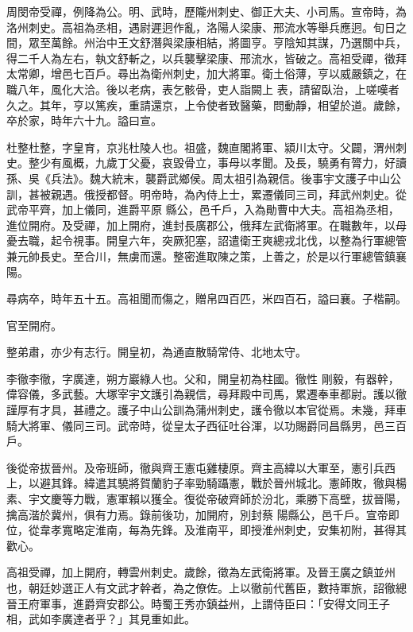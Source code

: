 \begin{pinyinscope}
 周閔帝受禪，例降為公。明、武時，歷隴州刺史、御正大夫、小司馬。宣帝時，為洛州刺史。高祖為丞相，遇尉遲迥作亂，洛陽人梁康、邢流水等舉兵應迥。旬日之間，眾至萬餘。州治中王文舒潛與梁康相結，將圖亨。亨陰知其謀，乃選關中兵，得二千人為左右，執文舒斬之，以兵襲擊梁康、邢流水，皆破之。高祖受禪，徵拜太常卿，增邑七百戶。尋出為衛州刺史，加大將軍。衛土俗薄，亨以威嚴鎮之，在職八年，風化大洽。後以老病，表乞骸骨，吏人詣闕上
 表，請留臥治，上嗟嘆者久之。其年，亨以篤疾，重請還京，上令使者致醫藥，問動靜，相望於道。歲餘，卒於家，時年六十九。謚曰宣。



 杜整杜整，字皇育，京兆杜陵人也。祖盛，魏直閣將軍、潁川太守。父闢，渭州刺史。整少有風概，九歲丁父憂，哀毀骨立，事母以孝聞。及長，驍勇有膂力，好讀孫、吳《兵法》。魏大統末，襲爵武鄉侯。周太祖引為親信。後事宇文護子中山公訓，甚被親遇。俄授都督。明帝時，為內侍上士，累遷儀同三司，拜武州刺史。從武帝平齊，加上儀同，進爵平原
 縣公，邑千戶，入為勛曹中大夫。高祖為丞相，進位開府。及受禪，加上開府，進封長廣郡公，俄拜左武衛將軍。在職數年，以母憂去職，起令視事。開皇六年，突厥犯塞，詔遣衛王爽總戎北伐，以整為行軍總管兼元帥長史。至合川，無虜而還。整密進取陳之策，上善之，於是以行軍總管鎮襄陽。



 尋病卒，時年五十五。高祖聞而傷之，贈帛四百匹，米四百石，謚曰襄。子楷嗣。



 官至開府。



 整弟肅，亦少有志行。開皇初，為通直散騎常侍、北地太守。



 李徹李徹，字廣達，朔方巖綠人也。父和，開皇初為柱國。徹性
 剛毅，有器幹，偉容儀，多武藝。大塚宰宇文護引為親信，尋拜殿中司馬，累遷奉車都尉。護以徹謹厚有才具，甚禮之。護子中山公訓為蒲州刺史，護令徹以本官從焉。未幾，拜車騎大將軍、儀同三司。武帝時，從皇太子西征吐谷渾，以功賜爵同昌縣男，邑三百戶。



 後從帝拔晉州。及帝班師，徹與齊王憲屯雞棲原。齊主高緯以大軍至，憲引兵西上，以避其鋒。緯遣其驍將賀蘭豹子率勁騎躡憲，戰於晉州城北。憲師敗，徹與楊素、宇文慶等力戰，憲軍賴以獲全。復從帝破齊師於汾北，乘勝下高壁，拔晉陽，擒高湝於冀州，俱有力焉。錄前後功，加開府，別封蔡
 陽縣公，邑千戶。宣帝即位，從韋孝寬略定淮南，每為先鋒。及淮南平，即授淮州刺史，安集初附，甚得其歡心。



 高祖受禪，加上開府，轉雲州刺史。歲餘，徵為左武衛將軍。及晉王廣之鎮並州也，朝廷妙選正人有文武才幹者，為之僚佐。上以徹前代舊臣，數持軍旅，詔徹總晉王府軍事，進爵齊安郡公。時蜀王秀亦鎮益州，上謂侍臣曰：「安得文同王子相，武如李廣達者乎？」其見重如此。




\end{pinyinscope}
